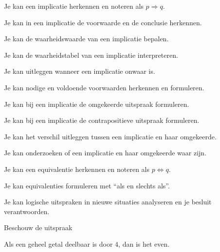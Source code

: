 \documentclass{ximera}
\begin{document}
\begin{leerdoelen}

  \item Je kan een implicatie herkennen en noteren als $p\Rightarrow q$.

  \item Je kan in een implicatie de voorwaarde en de conclusie herkennen.

  \item Je kan de waarheidswaarde van een implicatie bepalen.

  \item Je kan de waarheidstabel van een implicatie interpreteren.

  \item Je kan uitleggen wanneer een implicatie onwaar is.

  \item Je kan nodige en voldoende voorwaarden herkennen en formuleren.

  \item Je kan bij een implicatie de omgekeerde uitspraak formuleren.

  \item Je kan bij een implicatie de contrapositieve uitspraak formuleren.

  \item Je kan het verschil uitleggen tussen een implicatie en haar omgekeerde.

  \item Je kan onderzoeken of een implicatie en haar omgekeerde waar zijn.

  \item Je kan een equivalentie herkennen en noteren als $p\Leftrightarrow q$.

  \item Je kan equivalenties formuleren met ``als en slechts als''.

  \item Je kan logische uitspraken in nieuwe situaties analyseren en
        je besluit verantwoorden.

\end{leerdoelen}



Beschouw de uitspraak

\begin{center}
Als een geheel getal deelbaar is door $4$, dan is het even.
\end{center}
\end{document}

